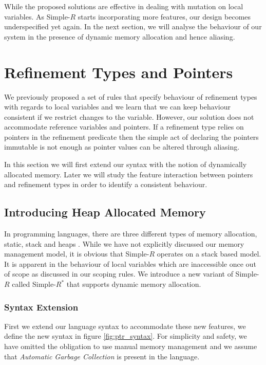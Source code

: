\documentclass[a4paper,12pt]{report}
\begin{document}
\par
While the proposed solutions are effective in dealing with mutation on local 
variables. As Simple-$R$ starts incorporating more features, our design becomes 
underspecified yet again. In the next section, we will analyse 
the behaviour of our system in the presence of dynamic memory allocation 
and hence aliasing.

\section{Refinement Types and Pointers}
We previously proposed a set of rules that specify behaviour of refinement 
types with regards to local variables and we learn that we can keep behaviour 
consistent if we restrict changes to the variable. However, our solution does 
not accommodate reference variables and pointers. If a refinement type 
relies on pointers in the refinement predicate then the simple act of declaring 
the pointers immutable is not enough as pointer values can be altered through aliasing. 

\par
In this section we will first extend our syntax with the notion of dynamically 
allocated memory. Later we will study the feature interaction between 
pointers and refinement types in order to identify a consistent behaviour. 

\subsection{Introducing Heap Allocated Memory}
In programming languages, there are three different types of memory allocation, 
static, stack and heaps \cite{heapVsStack}. While we have not explicitly 
discussed our memory management model, it is obvious that Simple-$R$ 
operates on a stack based model. It is apparent in the behaviour of local 
variables which are inaccessible once out of scope as discussed in our scoping rules. 
We introduce a new variant of Simple-$R$ called Simple-$R^{*}$ that supports 
dynamic memory allocation.

\subsubsection{Syntax Extension}
First we extend our language syntax to accommodate these new features, we define 
the new syntax in figure \ref{fig:ptr_syntax}. For simplicity and safety, 
we have omitted the obligation to use manual memory management and we 
assume that \textit{Automatic Garbage Collection} \cite{GC} is present in 
the language. 
\end{document}
